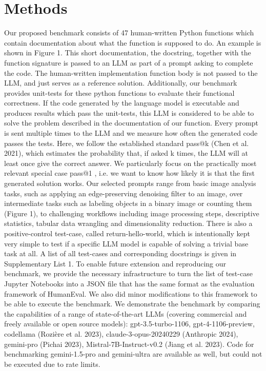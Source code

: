 \documentclass{ecai}
\begin{document}
\section{Methods}

Our proposed benchmark consists of 47 human-written Python functions which contain documentation about what the function is supposed to do. An example is shown in Figure 1. This short documentation, the docstring, together with the function signature is passed to an LLM as part of a prompt asking to complete the code. The human-written implementation function body is not passed to the LLM, and just serves as a reference  solution. Additionally, our benchmark provides unit-tests for these python functions to evaluate their functional correctness. If the code generated by  the language model is executable and produces results which pass the unit-tests, this LLM is considered to be able to solve the problem described in the documentation of our function. Every prompt is sent multiple times to the LLM and we measure how often the generated  code passes the tests. Here, we follow the established standard pass@k (Chen et al. 2021), which estimates the probability that, if asked k times, the LLM will at least once give the correct answer. We particularly focus on the practically most relevant special case pass@1 , i.e. we want to know how likely it is that the first generated solution works.  
Our selected prompts range from basic image analysis tasks, such as applying an edge-preserving denoising filter to an image, over intermediate tasks such as labeling objects in a binary image or counting them (Figure 1), to challenging workflows including image processing steps, descriptive statistics, tabular data wrangling and dimensionality reduction. There is also a positive-control test-case, called return-hello-world, which is intentionally kept very simple to test if a specific LLM model is  capable of solving a trivial base task at all. A list of all test-cases and corresponding docstrings is given in Supplementary List 1.
To enable future extension and reproducing our benchmark, we provide the necessary infrastructure to turn the list of test-case Jupyter Notebooks into a JSON file that has the same format as the evaluation framework of HumanEval. We also did minor modifications to this framework to be able to execute the benchmark.
We demonstrate the benchmark by comparing the capabilities of a range of state-of-the-art  LLMs (covering commercial and freely available or open source models): gpt-3.5-turbo-1106, gpt-4-1106-preview, codellama (Rozière et al. 2023), claude-3-opus-20240229 (Anthropic 2024), gemini-pro (Pichai 2023),  Mistral-7B-Instruct-v0.2 (Jiang et al. 2023). Code for benchmarking gemini-1.5-pro and gemini-ultra are available as well, but could not be executed due to rate limits. 
\end{document}
